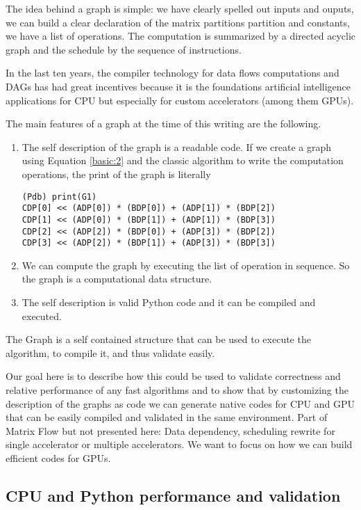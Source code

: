\documentclass[acmsmall]{acmart}
\begin{document}
The idea behind a graph is simple: we have clearly spelled out inputs
and ouputs, we can build a clear declaration of the matrix partitions
partition and constants, we have a list of operations. The computation
is summarized by a directed acyclic graph and the schedule by the
sequence of instructions.

In the last ten years, the compiler technology for data flows
computations and DAGs has had great incentives because it is the
foundations artificial intelligence applications for CPU but
especially for custom accelerators (among them GPUs).

The main features of a graph at the time of this writing are the
following.
\begin{enumerate} 
\item The self description of the graph is a readable code. If we
  create a graph using Equation \ref{basic:2} and the classic
  algorithm to write the computation operations, the print of the
  graph is literally
\begin{verbatim}
(Pdb) print(G1)
CDP[0] << (ADP[0]) * (BDP[0]) + (ADP[1]) * (BDP[2])
CDP[1] << (ADP[0]) * (BDP[1]) + (ADP[1]) * (BDP[3])
CDP[2] << (ADP[2]) * (BDP[0]) + (ADP[3]) * (BDP[2])
CDP[3] << (ADP[2]) * (BDP[1]) + (ADP[3]) * (BDP[3])
\end{verbatim}

\item We can compute the graph by executing the list of operation in
  sequence. So the graph is a computational data structure.

\item The self description is valid Python code and it can be compiled
  and executed.
\end{enumerate}

The Graph is a self contained structure that can be used to execute
the algorithm, to compile it, and thus validate easily.

Our goal here is to describe how this could be used to validate
correctness and relative performance of any fast algorithms and to
show that by customizing the description of the graphs as code we can
generate native codes for CPU and GPU that can be easily compiled and
validated in the same environment. Part of Matrix Flow but not
presented here: Data dependency, scheduling rewrite for single
accelerator or multiple accelerators. We want to focus on how we can
build efficient codes for GPUs.

\subsection{CPU and Python performance and validation}
\end{document}
